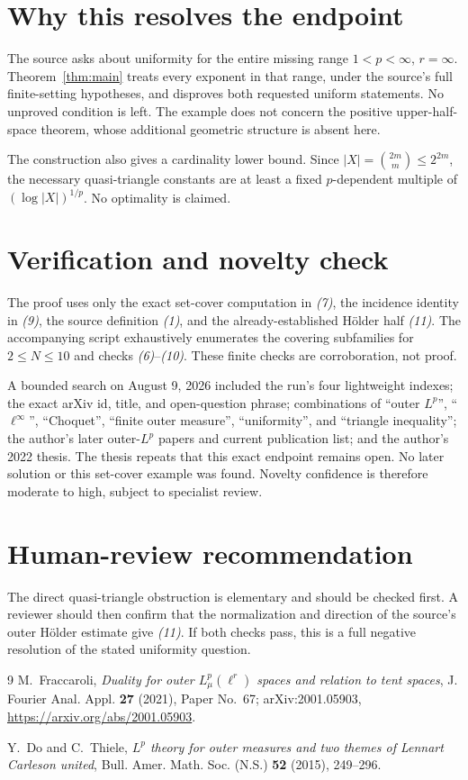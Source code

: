 \documentclass[10pt]{article}
\newcommand{\1}{\mathbf 1}
\begin{document}
\section*{Why this resolves the endpoint}

The source asks about uniformity for the entire missing range
$1<p<\infty$, $r=\infty$. Theorem~\ref{thm:main} treats every exponent in
that range, under the source's full finite-setting hypotheses, and disproves
both requested uniform statements. No unproved condition is left. The
example does not concern the positive upper-half-space theorem, whose
additional geometric structure is absent here.

The construction also gives a cardinality lower bound. Since
$|X|=\binom{2m}{m}\le 2^{2m}$, the necessary quasi-triangle constants are at
least a fixed $p$-dependent multiple of $(\log |X|)^{1/p}$. No optimality is
claimed.

\section*{Verification and novelty check}

The proof uses only the exact set-cover computation in \emph{(7)}, the
incidence identity in \emph{(9)}, the source definition \emph{(1)}, and the
already-established H\"older half \emph{(11)}. The accompanying script
exhaustively enumerates the covering subfamilies for $2\le N\le10$ and checks
\emph{(6)}--\emph{(10)}. These finite checks are corroboration, not proof.

A bounded search on August 9, 2026 included the run's four lightweight
indexes; the exact arXiv id, title, and open-question phrase; combinations of
``outer $L^p$'', ``$\ell^\infty$'', ``Choquet'', ``finite outer measure'',
``uniformity'', and ``triangle inequality''; the author's later
outer-$L^p$ papers and current publication list; and the author's 2022 thesis.
The thesis repeats that this exact endpoint remains open. No later solution or
this set-cover example was found. Novelty confidence is therefore moderate to
high, subject to specialist review.

\section*{Human-review recommendation}

The direct quasi-triangle obstruction is elementary and should be checked
first. A reviewer should then confirm that the normalization and direction of
the source's outer H\"older estimate give \emph{(11)}. If both checks pass,
this is a full negative resolution of the stated uniformity question.

{\small
\begin{thebibliography}{9}
M.~Fraccaroli,
\emph{Duality for outer $L^p_\mu(\ell^r)$ spaces and relation to tent spaces},
J. Fourier Anal. Appl. \textbf{27} (2021), Paper No.~67;
arXiv:2001.05903, \url{https://arxiv.org/abs/2001.05903}.

Y.~Do and C.~Thiele,
\emph{$L^p$ theory for outer measures and two themes of Lennart Carleson united},
Bull. Amer. Math. Soc. (N.S.) \textbf{52} (2015), 249--296.
\end{thebibliography}
}
\end{document}
